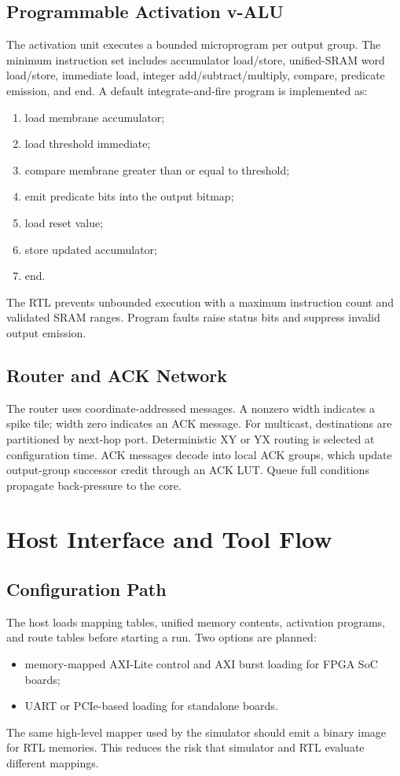 \documentclass[10pt,conference]{IEEEtran}
\begin{document}
\subsection{Programmable Activation v-ALU}
The activation unit executes a bounded microprogram per output group. The minimum instruction set includes accumulator load/store, unified-SRAM word load/store, immediate load, integer add/subtract/multiply, compare, predicate emission, and end. A default integrate-and-fire program is implemented as:
\begin{enumerate}
    \item load membrane accumulator;
    \item load threshold immediate;
    \item compare membrane greater than or equal to threshold;
    \item emit predicate bits into the output bitmap;
    \item load reset value;
    \item store updated accumulator;
    \item end.
\end{enumerate}
The RTL prevents unbounded execution with a maximum instruction count and validated SRAM ranges. Program faults raise status bits and suppress invalid output emission.

\subsection{Router and ACK Network}
The router uses coordinate-addressed messages. A nonzero width indicates a spike tile; width zero indicates an ACK message. For multicast, destinations are partitioned by next-hop port. Deterministic XY or YX routing is selected at configuration time. ACK messages decode into local ACK groups, which update output-group successor credit through an ACK LUT. Queue full conditions propagate back-pressure to the core.

\section{Host Interface and Tool Flow}
\subsection{Configuration Path}
The host loads mapping tables, unified memory contents, activation programs, and route tables before starting a run. Two options are planned:
\begin{itemize}
    \item memory-mapped AXI-Lite control and AXI burst loading for FPGA SoC boards;
    \item UART or PCIe-based loading for standalone boards.
\end{itemize}
The same high-level mapper used by the simulator should emit a binary image for RTL memories. This reduces the risk that simulator and RTL evaluate different mappings.
\end{document}

